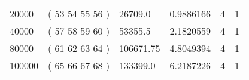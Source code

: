 \begin{longtable}{llllll}
    20000          & ( 53 54 55 56 )   & 26709.0            & 0.9886166        & 4                    & 1                       \\
    40000          & ( 57 58 59 60 )   & 53355.5            & 2.1820559        & 4                    & 1                       \\
    80000          & ( 61 62 63 64 )   & 106671.75          & 4.8049394        & 4                    & 1                       \\
    100000         & ( 65 66 67 68 )   & 133399.0           & 6.2187226        & 4                    & 1                      
    \end{longtable}